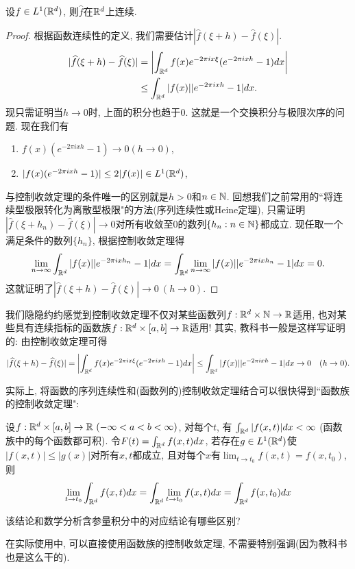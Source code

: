 \begin{example}[~($\hat{f} \in C(\R^d)$)]
    设$f \in L^1(\mathbb{R}^d)$, 则$\hat{f}$在$\mathbb{R}^d$上连续.
\end{example}
\begin{proof}
    根据函数连续性的定义, 我们需要估计$|\hat{f}(\xi+h) - \hat{f}(\xi)|$.
    \begin{align*}
    |\widehat{f}(\xi+h)-\widehat{f}(\xi)|
    &= \left|\int_{\mathbb{R}^d} f(x)e^{-2\pi ix \xi}(e^{-2\pi ixh}-1) dx \right|  \\
    &\leq \int_{\mathbb{R}^d} |f(x)||e^{-2\pi ixh}-1| dx.
    \end{align*}
    现只需证明当$h \to 0$时, 上面的积分也趋于$0$. 这就是一个交换积分与极限次序的问题.
    现在我们有
    \begin{enumerate}
        \item $f(x)(e^{-2\pi ixh}-1) \to 0 (h \to 0)$,
        \item $|f(x)(e^{-2\pi ixh}-1)| \leq 2|f(x)| \in L^1(\mathbb{R}^d)$,
    \end{enumerate}
    与控制收敛定理的条件唯一的区别就是$h>0$和$n \in \mathbb{N}$. 回想我们之前常用的``将连续型极限转化为离散型极限"的方法(序列连续性或Heine定理), 只需证明$|\hat{f}(\xi+h_n)-\hat{f}(\xi)| \to 0$对所有收敛至$0$的数列$\{h_n: n \in \mathbb{N}\}$都成立. 现任取一个满足条件的数列$\{h_n\}$, 根据控制收敛定理得
    $$\lim_{n \to \infty}\int_{\mathbb{R}^d} |f(x)||e^{-2\pi i xh_n}-1| dx
    = \int_{\mathbb{R}^d} \lim_{n \to \infty}|f(x)||e^{-2\pi i xh_n}-1| dx = 0. $$
    这就证明了$|\hat{f}(\xi+h) - \hat{f}(\xi)| \to 0 ~(h \to 0)$.
\end{proof}
\begin{remark}
    我们隐隐约约感觉到控制收敛定理不仅对某些函数列$f: \mathbb{R}^d \times \mathbb{N} \to \mathbb{R}$适用, 也对某些具有连续指标的函数族$f: \mathbb{R}^d \times [a, b] \to \mathbb{R}$适用! 其实, 教科书一般是这样写证明的:
    由控制收敛定理可得
    $$|\widehat{f}(\xi+h)-\widehat{f}(\xi)|
    = \left|\int_{\mathbb{R}^d} f(x)e^{-2\pi ix \xi}(e^{-2\pi ixh}-1) dx \right|  
    \leq \int_{\mathbb{R}^d} |f(x)||e^{-2\pi ixh}-1| dx \to 0 \quad (h \to 0).$$
\end{remark}
实际上, 将函数的序列连续性和(函数列的)控制收敛定理结合可以很快得到``函数族的控制收敛定理":
\begin{exercise} \label{switch_lim_int}
    设$f:\mathbb{R}^d \times [a,b] \to \mathbb{R} ~(-\infty<a<b<\infty)$, 对每个$t$, 有
    $\int_{\mathbb{R}^d} |f(x,t)|dx < \infty~$(函数族中的每个函数都可积). 令$F(t)=\int_{\mathbb{R}^d} f(x,t)dx$,
    若存在$g \in L^1(\mathbb{R}^d)$使$|f(x,t)| \leq |g(x)|$对所有$x,t$都成立, 且对每个$x$有$\lim_{t\to t_0}f(x,t)=f(x,t_0)$, 则
    $$\lim_{t\to t_0} \int_{\mathbb{R}^d} f(x,t)dx = \int_{\mathbb{R}^d} \lim_{t\to t_0} f(x,t)dx = \int_{\mathbb{R}^d} f(x,t_0)dx$$
\end{exercise}
\begin{problem}
    该结论和数学分析含参量积分中的对应结论有哪些区别? 
\end{problem}
在实际使用中, 可以直接使用函数族的控制收敛定理, 不需要特别强调(因为教科书也是这么干的). 
